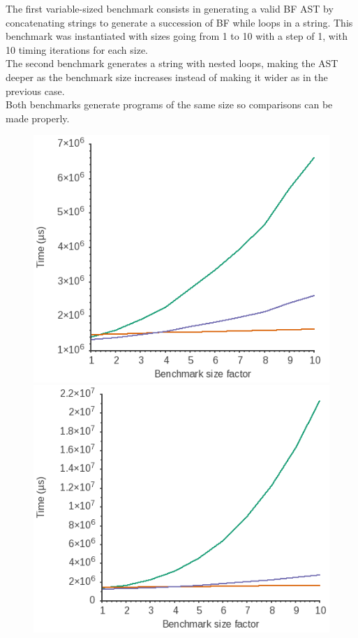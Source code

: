 \documentclass[../main]{subfiles}
\begin{document}
The first variable-sized benchmark consists in generating a valid BF AST by
concatenating strings to generate a succession of BF while loops in a
\constexpr string. This benchmark was instantiated with sizes going from 1 to
10 with a step of 1, with 10 timing iterations for each size.\\

The second benchmark generates a string with
nested loops, making the AST deeper as the benchmark size increases instead
of making it wider as in the previous case.\\

Both benchmarks generate programs of the same size so comparisons can be made
properly.

\begin{figure}
\includegraphics[scale=0.5]{images/bf-consecutive_loops.png}
\includegraphics[scale=0.5]{images/bf-imbricated_loops.png}

\end{figure}
\end{document}
